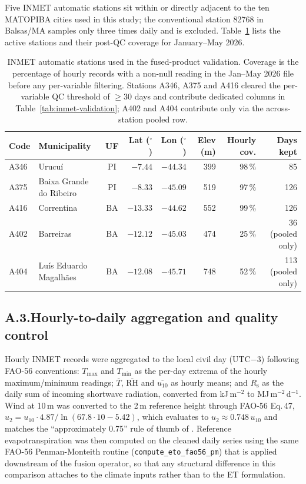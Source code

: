 Five INMET automatic stations sit within or directly adjacent to the
ten MATOPIBA cities used in this study; the conventional station 82768
in Balsas/MA samples only three times daily and is excluded.
Table~\ref{tab:inmet-stations} lists the active stations and their
post-QC coverage for January--May 2026.

\begin{table}[t]
\centering
\caption{INMET automatic stations used in the fused-product validation.
Coverage is the percentage of hourly records with a non-null reading
in the Jan--May 2026 file before any per-variable filtering. Stations
A346, A375 and A416 cleared the per-variable QC threshold of $\geq 30$
days and contribute dedicated columns in
Table~\ref{tab:inmet-validation}; A402 and A404 contribute only via
the across-station pooled row.}
\label{tab:inmet-stations}
\begin{tabular}{llcrrrrr}
\toprule
Code & Municipality & UF & Lat ($^\circ$) & Lon ($^\circ$) & Elev (m)
& Hourly cov. & Days kept \\
\midrule
A346 & Urucu\'i                  & PI & $-7.44$  & $-44.34$ & 399 & 98\,\% & 85 \\
A375 & Baixa Grande do Ribeiro  & PI & $-8.33$  & $-45.09$ & 519 & 97\,\% & 126 \\
A416 & Correntina               & BA & $-13.33$ & $-44.62$ & 552 & 99\,\% & 126 \\
A402 & Barreiras                & BA & $-12.12$ & $-45.03$ & 474 & 25\,\% & 36 (pooled only) \\
A404 & Lu\'is Eduardo Magalh\~aes & BA & $-12.08$ & $-45.71$ & 748 & 52\,\% & 113 (pooled only) \\
\bottomrule
\end{tabular}
\end{table}

\subsection*{A.3.\quad Hourly-to-daily aggregation and quality control}

Hourly INMET records were aggregated to the local civil day (UTC$-3$)
following FAO-56 conventions: $T_\mathrm{max}$ and $T_\mathrm{min}$ as
the per-day extrema of the hourly maximum/minimum readings;
$\overline{T}$, $\overline{\mathrm{RH}}$ and $\overline{u_{10}}$ as
hourly means; and $R_\mathrm{s}$ as the daily sum of incoming
shortwave radiation, converted from kJ\,m$^{-2}$ to MJ\,m$^{-2}$\,d$^{-1}$.
Wind at 10\,m was converted to the 2\,m reference height through
FAO-56 Eq.\,47, $u_2 = u_{10}\cdot 4.87/\ln(67.8\cdot 10 - 5.42)$,
which evaluates to $u_2 \approx 0.748\,u_{10}$ and matches the
``approximately 0.75'' rule of thumb of \citet{Allen1998}.
Reference evapotranspiration was then computed on the cleaned daily
series using the same FAO-56 Penman-Monteith routine
(\verb|compute_eto_fao56_pm|) that is applied downstream of the fusion
operator, so that any structural difference in this comparison
attaches to the climate inputs rather than to the ET formulation.

